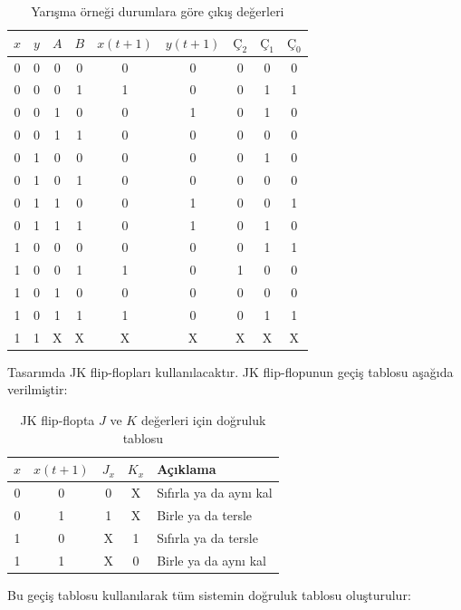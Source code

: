 \begin{table}[H]
\centering
\caption{Yarışma örneği durumlara göre çıkış değerleri}
\label{tab:B.17}
\small
\begin{tabular}{cccc|cc|ccc}
\toprule
$x$ & $y$ & $A$ & $B$ & $x(t+1)$ & $y(t+1)$ & $\text{Ç}_2$ & $\text{Ç}_1$ & $\text{Ç}_0$ \\
\midrule
0 & 0 & 0 & 0 & 0 & 0 & 0 & 0 & 0 \\
0 & 0 & 0 & 1 & 1 & 0 & 0 & 1 & 1 \\
0 & 0 & 1 & 0 & 0 & 1 & 0 & 1 & 0 \\
0 & 0 & 1 & 1 & 0 & 0 & 0 & 0 & 0 \\
0 & 1 & 0 & 0 & 0 & 0 & 0 & 1 & 0 \\
0 & 1 & 0 & 1 & 0 & 0 & 0 & 0 & 0 \\
0 & 1 & 1 & 0 & 0 & 1 & 0 & 0 & 1 \\
0 & 1 & 1 & 1 & 0 & 1 & 0 & 1 & 0 \\
1 & 0 & 0 & 0 & 0 & 0 & 0 & 1 & 1 \\
1 & 0 & 0 & 1 & 1 & 0 & 1 & 0 & 0 \\
1 & 0 & 1 & 0 & 0 & 0 & 0 & 0 & 0 \\
1 & 0 & 1 & 1 & 1 & 0 & 0 & 1 & 1 \\
1 & 1 & X & X & X & X & X & X & X \\
\bottomrule
\end{tabular}
\end{table}

Tasarımda JK flip-flopları kullanılacaktır. JK flip-flopunun geçiş tablosu aşağıda verilmiştir:

\begin{table}[H]
\centering
\caption{JK flip-flopta $J$ ve $K$ değerleri için doğruluk tablosu}
\label{tab:B.18}
\begin{tabular}{cc|cc|l}
\toprule
$x$ & $x(t+1)$ & $J_x$ & $K_x$ & \textbf{Açıklama} \\
\midrule
0 & 0 & 0 & X & Sıfırla ya da aynı kal \\
0 & 1 & 1 & X & Birle ya da tersle \\
1 & 0 & X & 1 & Sıfırla ya da tersle \\
1 & 1 & X & 0 & Birle ya da aynı kal \\
\bottomrule
\end{tabular}
\end{table}

Bu geçiş tablosu kullanılarak tüm sistemin doğruluk tablosu oluşturulur:

